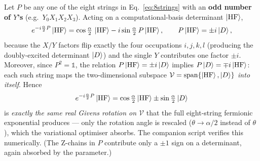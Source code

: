 \documentclass[11pt]{article}
\begin{document}
Let $P$ be any one of the eight strings in Eq.~\eqref{eq:8strings} with an
\textbf{odd number of $Y$'s} (e.g.\ $Y_0X_1X_2X_3$). Acting on a
computational-basis determinant $\ket{\rm HF}$,
\begin{equation}
  e^{-i\frac{\alpha}{2}P}\ket{\rm HF}
   = \cos\tfrac{\alpha}{2}\,\ket{\rm HF}
     - i\sin\tfrac{\alpha}{2}\,P\ket{\rm HF},
  \qquad
  P\ket{\rm HF} = \pm i \ket{D},
\end{equation}
because the $X/Y$ factors flip exactly the four occupations
$i,j,k,l$ (producing the doubly-excited determinant $\ket{D}$) and the
single $Y$ contributes one factor $\pm i$. Moreover, since $P^2=\mathbb{1}$,
the relation $P\ket{\rm HF}=\pm i\ket{D}$ implies $P\ket{D}=\mp i\ket{\rm HF}$:
each such string maps the two-dimensional subspace
$\mathcal{V}=\mathrm{span}\{\ket{\rm HF},\ket{D}\}$ \emph{into itself}. Hence
\begin{equation}
  e^{-i\frac{\alpha}{2}P}\ket{\rm HF}
  = \cos\tfrac{\alpha}{2}\ket{\rm HF} \pm \sin\tfrac{\alpha}{2}\ket{D}
\end{equation}
is \emph{exactly the same real Givens rotation on $\mathcal{V}$} that the
full eight-string fermionic exponential produces --- only the rotation angle
is rescaled ($\theta \to \alpha/2$ instead of $\theta$), which the
variational optimiser absorbs. The companion script verifies this
numerically. (The Z-chains in $P$ contribute only a $\pm1$ sign on a
determinant, again absorbed by the parameter.)
\end{document}
